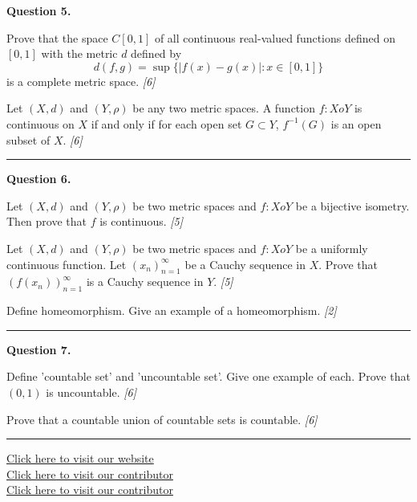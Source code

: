 \documentclass[11pt,a4paper]{article}
\newcommand{\pts}[1]{\hfill   \textit{[#1]}}
\begin{document}
\medskip


\noindent   \textbf{Question 5.}

\begin{parts}
  \item Prove that the space $C[0, 1]$ of all continuous real-valued functions defined on $[0, 1]$ with the metric $d$ defined by
  \[
  d(f, g) = \sup \{ |f(x) - g(x)| : x \in [0, 1] \}
  \]
  is a complete metric space. \pts{6}
  \item Let $(X, d)$ and $(Y, \rho)$ be any two metric spaces. A function $f: X  o Y$ is continuous on $X$ if and only if for each open set $G \subset Y$, $f^{-1}(G)$ is an open subset of $X$. \pts{6}
\end{parts}

\medskip\rule{\linewidth}{0.2pt}

\medskip


\noindent   \textbf{Question 6.}

\begin{parts}
  \item Let $(X, d)$ and $(Y, \rho)$ be two metric spaces and $f: X  o Y$ be a bijective isometry. Then prove that $f$ is continuous. \pts{5}
  \item Let $(X, d)$ and $(Y, \rho)$ be two metric spaces and $f: X  o Y$ be a uniformly continuous function. Let $(x_n)_{n=1}^\infty$ be a Cauchy sequence in $X$. Prove that $(f(x_n))_{n=1}^\infty$ is a Cauchy sequence in $Y$. \pts{5}
  \item Define homeomorphism. Give an example of a homeomorphism. \pts{2}
\end{parts}

\medskip\rule{\linewidth}{0.2pt}

\medskip


\noindent   \textbf{Question 7.}

\begin{parts}
  \item Define 'countable set' and 'uncountable set'. Give one example of each. Prove that $(0, 1)$ is uncountable. \pts{6}
  \item Prove that a countable union of countable sets is countable. \pts{6}
\end{parts}

\vfill
\rule{\linewidth}{0.4pt}

\begin{center}\small
  \href{https://bhu-exam.vercel.app/}{Click here to visit our website}\\[4pt]
  \href{https://me-aryan.vercel.app/}{Click here to visit our contributor}\\[4pt]
  \href{https://quashan-me.vercel.app/}{Click here to visit our contributor}
\end{center}
\end{document}

